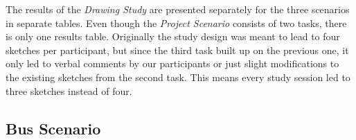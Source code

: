 The results of the \textit{Drawing Study} are presented separately for the three scenarios in separate tables. Even though the \textit{Project Scenario} consists of two tasks, there is only one results table. Originally the study design was meant to lead to four sketches per participant, but since the third task built up on the previous one, it only led to verbal comments by our participants or just slight modifications to the existing sketches from the second task. This means every study session led to three sketches instead of four.

\subsection*{Bus Scenario}

\begin{table}[H]
	\centering
	\caption{\textit{This table shows the results of the Bus Scenario of the Drawing Study. The first row of numbers shows the respective counts of every category. The \textbf{Explicit...} category is further split up into its four sub-categories and their respective counts.}}
	\label{tb:t1}
\end{table}

